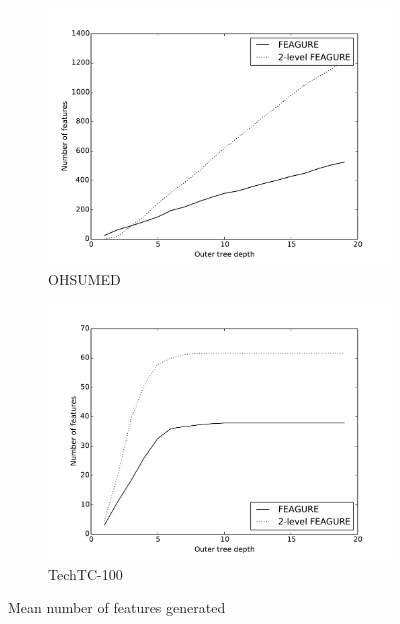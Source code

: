 \documentclass[twoside,11pt]{article}
\theoremstyle{definition}
\begin{document}
\begin{figure}
	\centering
	\begin{subfigure}{.55\textwidth}
		\centering
		\includegraphics[width=1.1\linewidth]{num_features_ohsumed.pdf}
		\caption{OHSUMED}
		\label{fig:features-depth-ohsumed}
	\end{subfigure}%
	\begin{subfigure}{.55\textwidth}
		\centering
		\includegraphics[width=1.1\linewidth]{num_features_techtc.pdf}
		\caption{TechTC-100}
		\label{fig:features-depth-techtc}
	\end{subfigure}
	\caption{Mean number of features generated}
	\label{fig:features-depth}
\end{figure}
\end{document}
